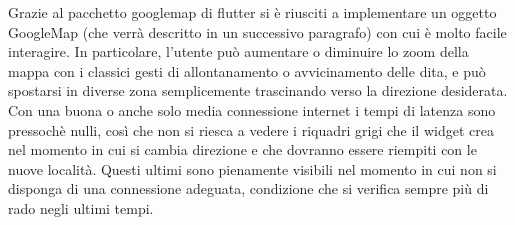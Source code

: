 Grazie al pacchetto googlemap di flutter si è riusciti a implementare un oggetto
GoogleMap (che verrà descritto in un successivo paragrafo) con cui è molto
facile interagire. In particolare, l'utente può aumentare o diminuire lo zoom
della mappa con i classici gesti di allontanamento o avvicinamento delle dita, e
può spostarsi in diverse zona semplicemente trascinando verso la direzione
desiderata. Con una buona o anche solo media connessione internet i tempi di
latenza sono pressochè nulli, così che non si riesca a vedere i riquadri grigi
che il widget crea nel momento in cui si cambia direzione e che dovranno essere
riempiti con le nuove località. Questi ultimi sono pienamente visibili nel
momento in cui non si disponga di una connessione adeguata, condizione che si
verifica sempre più di rado negli ultimi tempi. 


